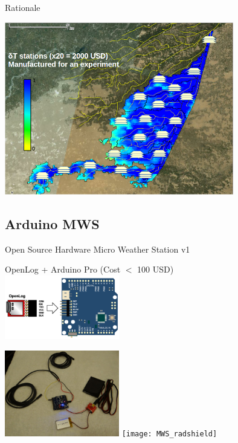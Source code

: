 \documentclass[xcolor=dvipsnames,beamer]{beamer} %
\begin{document}
\begin{frame}[fragile]{Rationale}

\begin{center}
  \includegraphics[width=10cm]{MWS_v1_deltaT_rationale_2}
\end{center}

\end{frame}

\subsection{Arduino MWS}
\begin{frame}[fragile]{Open Source Hardware Micro Weather Station v1}

\begin{center}
OpenLog + Arduino Pro (Cost $<$ 100 USD)\\
\vspace{5mm}
\includegraphics[width=5cm]{Arduino_OpenLog}
\end{center}

\begin{flushright}
  \includegraphics[width=5cm]{MWS}
  \hspace{5mm}
  \texttt{[image: MWS\_radshield]}
\end{flushright}
\end{frame}
\end{document}
